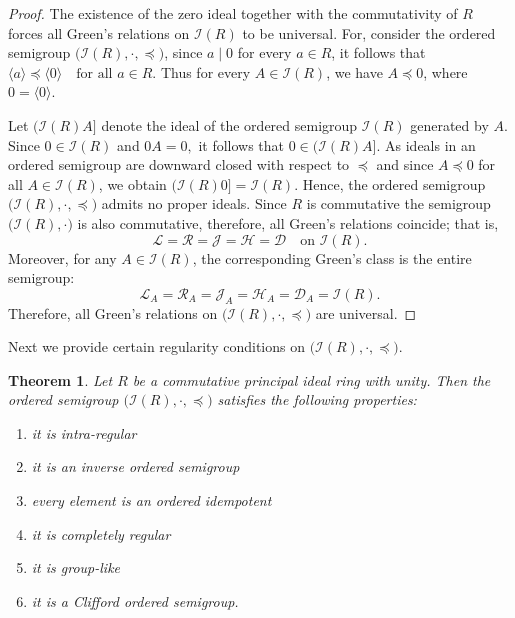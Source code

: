 \documentclass[12pt,a4paper]{amsart}
\theoremstyle{plain}
\newtheorem{theorem}{Theorem}[section]
\theoremstyle{definition}
\begin{document}
\begin{proof}
	The existence of the zero ideal together with the
	commutativity of $R$ forces all Green’s relations on
	$\mathcal{I}(R)$ to be universal. For, consider the ordered semigroup
	$\big(\mathcal{I}(R), \cdot , \preccurlyeq\big)$, since $a \mid 0$ for every $a \in R$, it follows that
$\langle a \rangle \preccurlyeq \langle 0 \rangle \quad \text{for all } a \in R.$
Thus for every $A \in \mathcal{I}(R)$, we have $A \preccurlyeq 0$, where $0 = \langle 0 \rangle$.
	
Let $(\mathcal{I}(R)A]$ denote the ideal of the ordered semigroup $\mathcal{I}(R)$ generated by $A$. Since $0 \in \mathcal{I}(R)$ and
$0A = 0,$ 	it follows that $0 \in (\mathcal{I}(R)A]$. 
	As ideals in an ordered semigroup are downward closed with respect to $\preccurlyeq$ and since $A \preccurlyeq 0$ for all $A \in \mathcal{I}(R)$, we obtain
$(\mathcal{I}(R)0] = \mathcal{I}(R).$
	Hence, the ordered semigroup $\big(\mathcal{I}(R), \cdot , \preccurlyeq\big)$ admits no proper ideals.
	Since $R$ is commutative the semigroup $\big(\mathcal{I}(R), \cdot\big)$ is also commutative, therefore, all Green’s relations coincide; that is,
	\[
	\mathcal{L} = \mathcal{R} = \mathcal{J} = \mathcal{H} = \mathcal{D}
	\quad \text{on } \mathcal{I}(R).
	\]
	Moreover, for any $A \in \mathcal{I}(R)$, the corresponding Green’s class is the entire semigroup:
	\[
	\mathcal{L}_{A}
	= \mathcal{R}_{A}
	= \mathcal{J}_{A}
	= \mathcal{H}_{A}
	= \mathcal{D}_{A}
	= \mathcal{I}(R).
	\]
Therefore, all Green’s relations on $\big(\mathcal{I}(R), \cdot , \preccurlyeq\big)$ are universal.
\end{proof}
Next we provide certain regularity conditions on $\big(\mathcal{I}(R), \cdot , \preccurlyeq\big)$.
\begin{theorem}
	Let $R$ be a commutative principal ideal ring with unity.  
	Then the ordered semigroup
	$\big(\mathcal{I}(R), \cdot , \preccurlyeq \big)$ satisfies the following properties:
	\begin{enumerate}
		\item it is intra-regular
		\item it is an inverse ordered semigroup
		\item every element is an ordered idempotent
		\item it is completely regular
		\item it is group-like
		\item it is a Clifford ordered semigroup.
	\end{enumerate}
\end{theorem}
 
\end{document}
